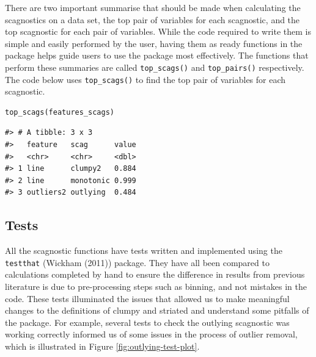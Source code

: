 There are two important summarise that should be made when calculating the scagnostics on a data set, the top pair of variables for each scagnostic, and the top scagnostic for each pair of variables. While the code required to write them is simple and easily performed by the user, having them as ready functions in the package helps guide users to use the package most effectively. The functions that perform these summaries are called \texttt{top\_scags()} and \texttt{top\_pairs()} respectively. The code below uses \texttt{top\_scags()} to find the top pair of variables for each scagnostic.

\begin{verbatim}
top_scags(features_scags)
\end{verbatim}

\begin{verbatim}
#> # A tibble: 3 x 3
#>   feature   scag      value
#>   <chr>     <chr>     <dbl>
#> 1 line      clumpy2   0.884
#> 2 line      monotonic 0.999
#> 3 outliers2 outlying  0.484
\end{verbatim}

\hypertarget{tests}{%
\subsection{Tests}\label{tests}}

All the scagnostic functions have tests written and implemented using the \texttt{testthat} (Wickham (2011)) package. They have all been compared to calculations completed by hand to ensure the difference in results from previous literature is due to pre-processing steps such as binning, and not mistakes in the code. These tests illuminated the issues that allowed us to make meaningful changes to the definitions of clumpy and striated and understand some pitfalls of the package. For example, several tests to check the outlying scagnostic was working correctly informed us of some issues in the process of outlier removal, which is illustrated in Figure \ref{fig:outlying-test-plot}.

